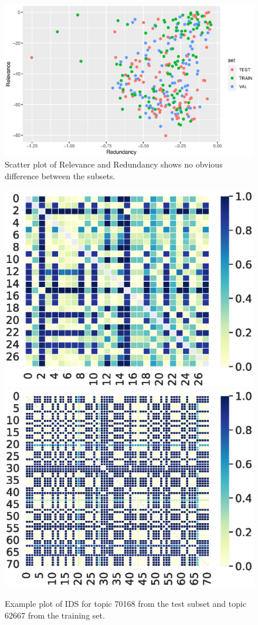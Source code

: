 \documentclass[../main.tex]{subfiles}
\begin{document}

\begin{figure}
    \includegraphics[width=\textwidth]{figures/analysis-2.eps}
    \caption{Scatter plot of Relevance and Redundancy shows no obvious difference between the subsets.} \label{fig:analysis-2}
\end{figure}


\begin{figure}
    \includegraphics[width=.49\textwidth]{figures/test70168.eps}
    \includegraphics[width=.49\textwidth]{figures/train62667.eps}
    \caption{Example plot of IDS for topic 70168 from the test subset and topic 62667 from the training set.} \label{fig:analysis-ids-test}
\end{figure}
\end{document}
